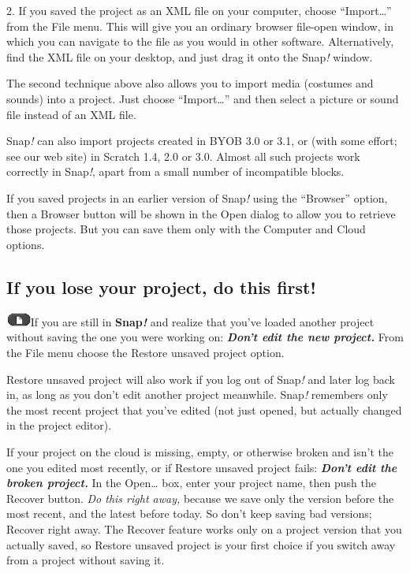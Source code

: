 2. If you saved the project as an XML file on your computer, choose
``Import\ldots'' from the File menu. This will give you an ordinary
browser file-open window, in which you can navigate to the file as you
would in other software. Alternatively, find the XML file on your
desktop, and just drag it onto the Snap\emph{!} window.

The second technique above also allows you to import media (costumes and
sounds) into a project. Just choose ``Import\ldots'' and then select a
picture or sound file instead of an XML file.

Snap\emph{!} can also import projects created in BYOB 3.0 or 3.1, or
(with some effort; see our web site) in Scratch 1.4, 2.0 or 3.0. Almost
all such projects work correctly in Snap\emph{!}, apart from a small
number of incompatible blocks.

If you saved projects in an earlier version of Snap\emph{!} using the
``Browser'' option, then a Browser button will be shown in the Open
dialog to allow you to retrieve those projects. But you can save them
only with the Computer and Cloud options.

\subsection{If you lose your project, do this
first!}\label{if-you-lose-your-project-do-this-first}

\includegraphics[width=0.31944in,height=0.18056in]{media/image384.png}If
you are still in \textbf{Snap\emph{!}} and realize that you've loaded
another project without saving the one you were working on:
\emph{\textbf{Don't edit the new project.}} From the File menu choose
the Restore unsaved project option.

Restore unsaved project will also work if you log out of Snap\emph{!}
and later log back in, as long as you don't edit another project
meanwhile. Snap\emph{!} remembers only the most recent project that
you've edited (not just opened, but actually changed in the project
editor).

If your project on the cloud is missing, empty, or otherwise broken and
isn't the one you edited most recently, or if Restore unsaved project
fails: \emph{\textbf{Don't edit the broken project.}} In the
Open\ldots{} box, enter your project name, then push the Recover button.
\emph{Do this right away,} because we save only the version before the
most recent, and the latest before today. So don't keep saving bad
versions; Recover right away. The Recover feature works only on a
project version that you actually saved, so Restore unsaved project is
your first choice if you switch away from a project without saving it.

